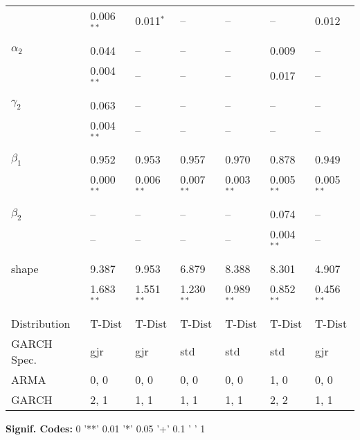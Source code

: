 \documentclass[12pt]{article}
\begin{document}
\begin{table}
\begin{tabular}{l l l l | l l l}
                       &  0.006$^{**}$    & 0.011$^{*}$  &    --        &    --        &    --        & 0.012        \\ \\
         $\alpha_{2}$  &  0.044           &    --        &    --        &    --        & 0.009        &    --        \\
                       &  0.004$^{**}$    &    --        &    --        &    --        & 0.017        &    --        \\ \\
         $\gamma_{2}$  &  0.063           &    --        &    --        &    --        &    --        &    --        \\
                       &  0.004$^{**}$    &    --        &    --        &    --        &    --        &    --        \\ \\
         $\beta_{1}$   &  0.952           & 0.953        & 0.957        & 0.970        & 0.878        & 0.949        \\
                       &  0.000$^{**}$    & 0.006$^{**}$ & 0.007$^{**}$ & 0.003$^{**}$ & 0.005$^{**}$ & 0.005$^{**}$ \\ \\
         $\beta_{2}$   &     --           &    --        &    --        &    --        & 0.074        &    --        \\
                       &     --           &    --        &    --        &    --        & 0.004$^{**}$ &    --        \\ \\
         shape         &  9.387           & 9.953        & 6.879        & 8.388        & 8.301        & 4.907        \\
                       &  1.683$^{**}$    & 1.551$^{**}$ & 1.230$^{**}$ & 0.989$^{**}$ & 0.852$^{**}$ & 0.456$^{**}$ \\ \\
		 Distribution  & T-Dist           & T-Dist       & T-Dist       & T-Dist       & T-Dist       & T-Dist       \\
		 GARCH Spec.   & gjr              &   gjr        &    std       &    std       &    std       &  gjr         \\
		 ARMA          &  0, 0            &  0, 0        &   0, 0       &   0, 0       &   1, 0       &  0, 0        \\
		 GARCH         &  2, 1            &  1, 1        &   1, 1       &   1, 1       &   2, 2       &  1, 1        \\
		\midrule
	\end{tabular}
	\begin{tablenotes}
		\item{\footnotesize \textbf{Signif. Codes:} 0 '**' 0.01 '*' 0.05 '+' 0.1 ' ' 1}
	\end{tablenotes}
	\label{tbl:marginal_model_regressions}
\end{table}
\end{document}

